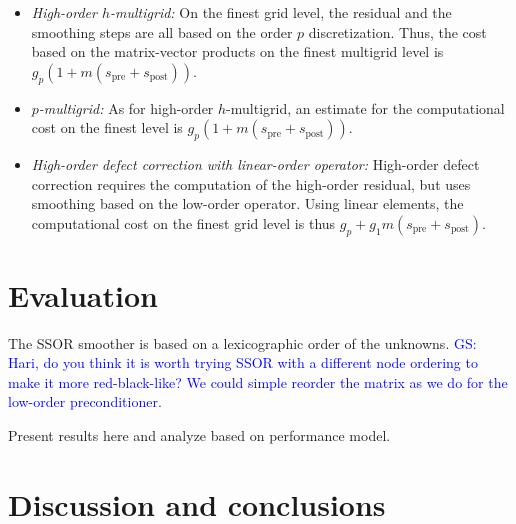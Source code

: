 \documentclass[smallcondensed,final]{svjour3}     %
\newcommand{\gsnote}[1]{\textcolor{blue}{GS: #1}}
\begin{document}
\begin{itemize}
\item {\em High-order $h$-multigrid:} On the finest grid level, the
  residual and the smoothing steps are all based on the order $p$
  discretization. Thus, the cost based on the matrix-vector products
  on the finest multigrid level is
  $g_p(1+m(s_\text{pre}+s_\text{post}))$.

\item {\em $p$-multigrid:} As for high-order $h$-multigrid, an
  estimate for the computational cost on the finest level is
  $g_p(1+m(s_\text{pre}+s_\text{post}))$.

\item {\em High-order defect correction with linear-order operator:}
  High-order defect correction requires the computation of the
  high-order residual, but uses smoothing based on the low-order
  operator. Using linear elements, the computational cost on the
  finest grid level is thus
  $g_p+g_1m(s_\text{pre}+s_\text{post})$.


\end{itemize}



\section{Evaluation}


The SSOR smoother is based on a
lexicographic order of the unknowns.  \gsnote{Hari, do you think it is
  worth trying SSOR with a different node ordering to make it more
  red-black-like? We could simple reorder the matrix as we do for the
  low-order preconditioner.}



Present results here and analyze based on performance model.




\section{Discussion and conclusions}

\end{document}
